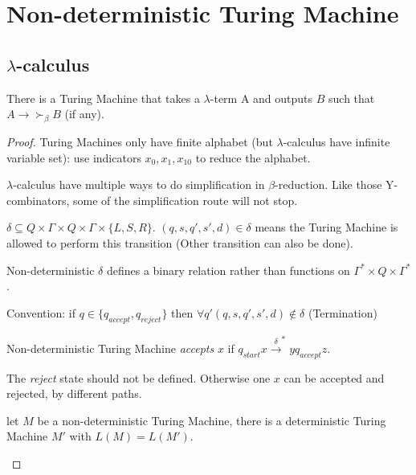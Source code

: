 \section{Non-deterministic Turing Machine}

\subsection{\texorpdfstring{$\lambda$}{λ}-calculus}

\begin{theorem}
There is a Turing Machine that takes a
\(\lambda\)-term A and outputs \(B\) such that
\(A \rightarrow \succ_\beta B\) (if any).
\end{theorem}

\begin{proof}

Turing Machines only have finite alphabet (but \(\lambda\)-calculus have
infinite variable set): use indicators \(x_0, x_1, x_{10}\) to reduce
the alphabet.

\(\lambda\)-calculus have multiple ways to do simplification in
\(\beta\)-reduction. Like those Y-combinators, some of the
simplification route will not stop.

\begin{definition}
\(\delta \subseteq Q \times \Gamma \times Q \times \Gamma \times \{L,S,R\}\).
\((q,s,q',s',d) \in \delta\) means the Turing Machine is allowed to
perform this transition (Other transition can also be done).

Non-deterministic \(\delta\) defines a binary relation rather than
functions on \(\Gamma^*\times Q \times \Gamma^*\).
\end{definition}

Convention: if \(q \in \{q_{accept}, q_{reject}\}\) then
\(\forall q' (q,s,q',s',d) \not \in \delta\) (Termination)

\begin{definition}
Non-deterministic Turing Machine \emph{accepts} \(x\) if
\(q_{start} x \overset{\delta}{\rightarrow}^* yq_{accept}z\).

The \emph{reject} state should not be defined. Otherwise one \(x\) can
be accepted and rejected, by different paths.
\end{definition}


\begin{theorem}
let \(M\) be a non-deterministic Turing Machine, there
is a deterministic Turing Machine \(M'\) with \(L(M) = L(M')\).
\end{theorem}


\end{proof}
